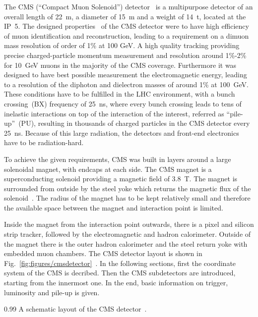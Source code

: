 The CMS (``Compact Muon Solenoid'') detector~\cite{Chatrchyan:2008aa} is a multipurpose detector of an overall length of 22~m, a diameter of 15~m and a weight of 14~t, located at the IP~5. The designed properties~\cite{CMSproposal} of the CMS  detector were to have high efficiency of muon identification and reconstruction, leading to a requirement on  a dimuon mass resolution of order of 1\% at 100 GeV. A high quality tracking providing precise charged-particle momentum measurement and resolution around 1\%-2\% for 10~GeV muons in the majority of the CMS coverage. Furthermore it was designed to have best possible measurement the electromagnetic energy, leading to a resolution of the diphoton and dielectron masses of around 1\% at 100~GeV. These conditions have to be fulfilled in the LHC environment, with a bunch crossing~(BX) frequency of 25~ns, where every bunch crossing leads to tens of inelastic interactions on top of the interaction of the interest, referred as ``pile-up''~(PU), resulting in thousands of charged particles in the CMS detector every 25~ns. Because of this large radiation, the detectors and front-end electronics have to be radiation-hard.

To achieve the given requirements, CMS was built in layers around a large solenoidal magnet, with endcaps at each side. The CMS magnet is a superconducting solenoid providing a magnetic field of 3.8~T. The magnet is surrounded from outside by the steel yoke which returns the magnetic flux of the solenoid~\cite{tdrMagnet}. The radius of the magnet has to be kept relatively small and therefore the available space between the magnet and interaction point is limited.

Inside the magnet from the interaction point outwards, there is a pixel and silicon strip tracker, followed by the electromagnetic and hadron calorimeter. Outside of the magnet there is the outer hadron calorimeter and the steel return yoke with embedded muon chambers. The CMS detector layout is shown in Fig.~\ref{fig:figures/cmsdetector}~\cite{website:CMSdet}. In the following sections, first the coordinate system of the CMS is decribed. Then the CMS subdetectors are introduced, starting from the innermost one. In the end, basic information on trigger, luminosity and pile-up is given.


                 {0.99}       %
                 { A schematic layout of the CMS detector~\cite{website:CMSdet}. }

